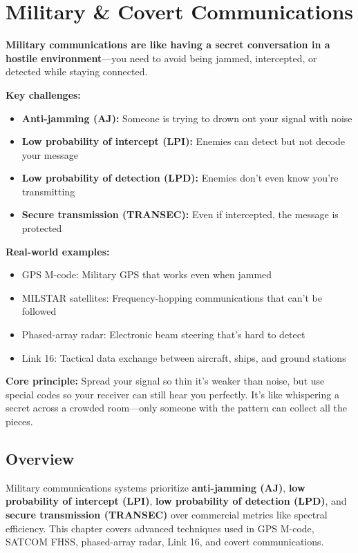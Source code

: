 \chapter{Military \& Covert Communications}
\label{ch:military-covert}

\begin{nontechnical}
\textbf{Military communications are like having a secret conversation in a hostile environment}---you need to avoid being jammed, intercepted, or detected while staying connected.

\textbf{Key challenges:}
\begin{itemize}
\item \textbf{Anti-jamming (AJ):} Someone is trying to drown out your signal with noise
\item \textbf{Low probability of intercept (LPI):} Enemies can detect but not decode your message
\item \textbf{Low probability of detection (LPD):} Enemies don't even know you're transmitting
\item \textbf{Secure transmission (TRANSEC):} Even if intercepted, the message is protected
\end{itemize}

\textbf{Real-world examples:}
\begin{itemize}
\item GPS M-code: Military GPS that works even when jammed
\item MILSTAR satellites: Frequency-hopping communications that can't be followed
\item Phased-array radar: Electronic beam steering that's hard to detect
\item Link 16: Tactical data exchange between aircraft, ships, and ground stations
\end{itemize}

\textbf{Core principle:} Spread your signal so thin it's weaker than noise, but use special codes so your receiver can still hear you perfectly. It's like whispering a secret across a crowded room---only someone with the pattern can collect all the pieces.
\end{nontechnical}

\section{Overview}

Military communications systems prioritize \textbf{anti-jamming (AJ)}, \textbf{low probability of intercept (LPI)}, \textbf{low probability of detection (LPD)}, and \textbf{secure transmission (TRANSEC)} over commercial metrics like spectral efficiency. This chapter covers advanced techniques used in GPS M-code, SATCOM FHSS, phased-array radar, Link 16, and covert communications.

